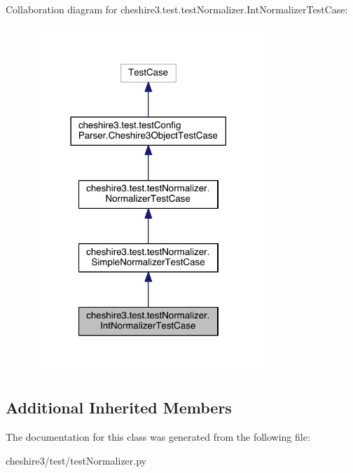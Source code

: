 Collaboration diagram for cheshire3.\-test.\-test\-Normalizer.\-Int\-Normalizer\-Test\-Case\-:
\nopagebreak
\begin{figure}[H]
\begin{center}
\leavevmode
\includegraphics[width=246pt]{classcheshire3_1_1test_1_1test_normalizer_1_1_int_normalizer_test_case__coll__graph}
\end{center}
\end{figure}
\subsection*{Additional Inherited Members}


The documentation for this class was generated from the following file\-:\begin{DoxyCompactItemize}
\item 
cheshire3/test/test\-Normalizer.\-py\end{DoxyCompactItemize}
